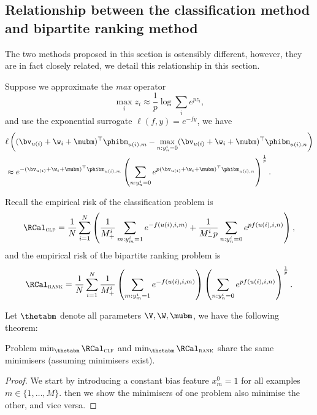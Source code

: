 \subsection{Relationship between the classification method and bipartite ranking method}
The two methods proposed in this section is ostensibly different, 
however, they are in fact closely related, we detail this relationship in this section.

Suppose we approximate the \emph{max} operator
\begin{equation*}
\max_i z_i \approx \frac{1}{p} \log \sum_i e^{p z_i},
\end{equation*}
and use the exponential surrogate $\ell(f, y) = e^{-fy}$, we have
\begin{equation*}
\begin{aligned}
&\ell \left( (\bv_{u(i)} + \w_i + \mubm)^\top \phibm_{u(i),m} - \max_{n: y_n^i = 0} (\bv_{u(i)} + \w_i + \mubm)^\top \phibm_{u(i),n} \right) \\
&\approx e^{-(\bv_{u(i)} + \w_i + \mubm)^\top \phibm_{u(i),m}}
   \left( \sum_{n: y_n^i = 0} e^{p (\bv_{u(i)} + \w_i + \mubm)^\top \phibm_{u(i),n}} \right)^\frac{1}{p}.
\end{aligned}
\end{equation*}

Recall the empirical risk of the classification problem is
\begin{equation*}
\RCal_\textsc{clf} 
= \frac{1}{N} \sum_{i=1}^N \left( 
  \frac{1}{M_+^i} \sum_{m: y_m^i = 1} e^{-f(u(i), i,m)} 
  + \frac{1}{M_-^i p} \sum_{n: y_n^i = 0} e^{p f(u(i), i,n)} \right),
\end{equation*}
and the empirical risk of the bipartite ranking problem is
\begin{equation*}
\RCal_\textsc{rank} 
= \frac{1}{N} \sum_{i=1}^N \frac{1}{M_+^i} 
  \left( \sum_{m: y_m^i = 1} e^{-f(u(i), i, m)} \right)
  \left( \sum_{n: y_n^i = 0} e^{p f(u(i), i, n)} \right)^\frac{1}{p}.
\end{equation*}

Let $\thetabm$ denote all parameters $\V, \W, \mubm$, we have the following theorem:
\begin{theorem}
Problem $\min_{\thetabm} \RCal_\textsc{clf}$ and $\min_{\thetabm} \RCal_\textsc{rank}$ share the same minimisers
(assuming minimisers exist).
\end{theorem}

\begin{proof}
We start by introducing a constant bias feature $x_m^0 = 1$ for all examples $m \in \{1,\dots,M\}$.
then we show the minimisers of one problem also minimise the other, and vice versa.
\end{proof}
